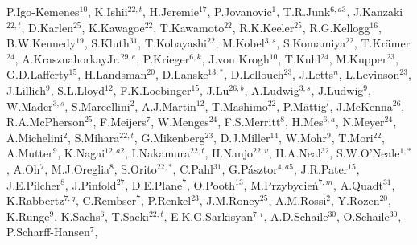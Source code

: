{\begin{center}
{P.\thinspace Igo-Kemenes$^{ 10}$,
K.\thinspace Ishii$^{ 22, t}$,
H.\thinspace Jeremie$^{ 17}$,
P.\thinspace Jovanovic$^{  1}$,
T.R.\thinspace Junk$^{  6,  a3}$,
J.\thinspace Kanzaki$^{ 22,  t}$,
D.\thinspace Karlen$^{ 25}$,
K.\thinspace Kawagoe$^{ 22}$,
T.\thinspace Kawamoto$^{ 22}$,
R.K.\thinspace Keeler$^{ 25}$,
R.G.\thinspace Kellogg$^{ 16}$,
B.W.\thinspace Kennedy$^{ 19}$,
S.\thinspace Kluth$^{ 31}$,
T.\thinspace Kobayashi$^{ 22}$,
M.\thinspace Kobel$^{  3,  s}$,
S.\thinspace Komamiya$^{ 22}$,
T.\thinspace Kr\"amer$^{ 24}$,
A.\thinspace Krasznahorkay\thinspace Jr.$^{ 29,  e}$,
P.\thinspace Krieger$^{  6,  k}$,
J.\thinspace von Krogh$^{ 10}$,
T.\thinspace Kuhl$^{  24}$,
M.\thinspace Kupper$^{ 23}$,
G.D.\thinspace Lafferty$^{ 15}$,
H.\thinspace Landsman$^{ 20}$,
D.\thinspace Lanske$^{ 13, *}$,
D.\thinspace Lellouch$^{ 23}$,
J.\thinspace Letts$^{  n}$,
L.\thinspace Levinson$^{ 23}$,
J.\thinspace Lillich$^{  9}$,
S.L.\thinspace Lloyd$^{ 12}$,
F.K.\thinspace Loebinger$^{ 15}$,
J.\thinspace Lu$^{ 26,  b}$,
A.\thinspace Ludwig$^{  3,  s}$,
J.\thinspace Ludwig$^{  9}$,
W.\thinspace Mader$^{  3,  s}$,
S.\thinspace Marcellini$^{  2}$,
A.J.\thinspace Martin$^{ 12}$,
T.\thinspace Mashimo$^{ 22}$,
P.\thinspace M\"attig$^{  l}$,    
J.\thinspace McKenna$^{ 26}$,
R.A.\thinspace McPherson$^{ 25}$,
F.\thinspace Meijers$^{  7}$,
W.\thinspace Menges$^{ 24}$,
F.S.\thinspace Merritt$^{  8}$,
H.\thinspace Mes$^{  6,  a}$,
N.\thinspace Meyer$^{ 24}$,
A.\thinspace Michelini$^{  2}$,
S.\thinspace Mihara$^{ 22, t}$,
G.\thinspace Mikenberg$^{ 23}$,
D.J.\thinspace Miller$^{ 14}$,
W.\thinspace Mohr$^{  9}$,
T.\thinspace Mori$^{ 22}$,
A.\thinspace Mutter$^{  9}$,
K.\thinspace Nagai$^{ 12, a2}$,
I.\thinspace Nakamura$^{ 22,  t}$,
H.\thinspace Nanjo$^{ 22, v}$,
H.A.\thinspace Neal$^{ 32}$,
S.W.\thinspace O'Neale$^{  1,  *}$,
A.\thinspace Oh$^{  7}$,
M.J.\thinspace Oreglia$^{  8}$,
S.\thinspace Orito$^{ 22,  *}$,
C.\thinspace Pahl$^{ 31}$,
G.\thinspace P\'asztor$^{  4, a5}$,
J.R.\thinspace Pater$^{ 15}$,
J.E.\thinspace Pilcher$^{  8}$,
J.\thinspace Pinfold$^{ 27}$,
D.E.\thinspace Plane$^{  7}$,
O.\thinspace Pooth$^{ 13}$,
M.\thinspace Przybycie\'n$^{  7,  m}$,
A.\thinspace Quadt$^{ 31}$,
K.\thinspace Rabbertz$^{  7,  q}$,
C.\thinspace Rembser$^{  7}$,
P.\thinspace Renkel$^{ 23}$,
J.M.\thinspace Roney$^{ 25}$,
A.M.\thinspace Rossi$^{  2}$,
Y.\thinspace Rozen$^{ 20}$,
K.\thinspace Runge$^{  9}$,
K.\thinspace Sachs$^{  6}$,
T.\thinspace Saeki$^{ 22, t}$,
E.K.G.\thinspace Sarkisyan$^{  7,  i}$,
A.D.\thinspace Schaile$^{ 30}$,
O.\thinspace Schaile$^{ 30}$,
P.\thinspace Scharff-Hansen$^{  7}$,
}
\end{center}}
